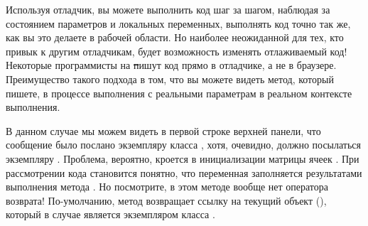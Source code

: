 \documentclass[a4paper,10pt,twoside]{book}
\begin{document}
{%
Используя отладчик, вы можете выполнить код шаг за шагом, наблюдая за состоянием параметров и локальных переменных, выполнять код точно так же, как вы это делаете в рабочей области. Но наиболее неожиданной для тех, кто привык к другим отладчикам, будет возможность изменять отлаживаемый код! Некоторые программисты на \st пишут код прямо в отладчике, а не в браузере. Преимущество такого подхода в том, что вы можете видеть метод, который пишете, в процессе выполнения с реальными параметрам в реальном контексте выполнения.

В данном случае мы можем видеть в первой строке верхней панели, что сообщение  было послано экземпляру класса , хотя, очевидно, должно посылаться экземпляру .
Проблема, вероятно, кроется в инициализации матрицы ячеек .
При рассмотрении кода  становится понятно, что переменная  заполняется результатами выполнения метода . Но посмотрите, в этом методе вообще нет оператора возврата!
По-умолчанию, метод возвращает ссылку на текущий объект (), который в случае  является экземпляром класса .

\dothis{Закройте окно отладчика.
Добавьте выражение ``\ct{^ c}'' в конец метода \ct{LOGame>>>newCellAt:at:}, чтобы он возвращал значение переменной \ct{c}.
(см. \mthref{newCellAt:at:nobug}.)}

}
\end{document}
